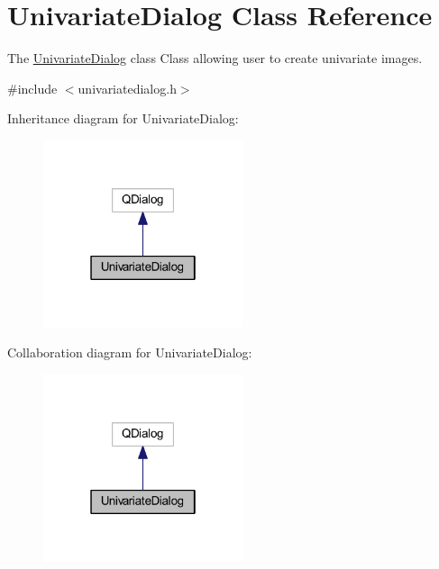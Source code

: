 \hypertarget{class_univariate_dialog}{\section{Univariate\+Dialog Class Reference}
\label{class_univariate_dialog}
}


The \hyperlink{class_univariate_dialog}{Univariate\+Dialog} class Class allowing user to create univariate images.  




{\ttfamily \#include $<$univariatedialog.\+h$>$}



Inheritance diagram for Univariate\+Dialog\+:\nopagebreak
\begin{figure}[H]
\begin{center}
\leavevmode
\includegraphics[width=166pt]{class_univariate_dialog__inherit__graph}
\end{center}
\end{figure}


Collaboration diagram for Univariate\+Dialog\+:\nopagebreak
\begin{figure}[H]
\begin{center}
\leavevmode
\includegraphics[width=166pt]{class_univariate_dialog__coll__graph}
\end{center}
\end{figure}
